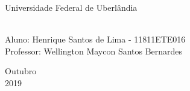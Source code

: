 \documentclass[a4paper, 12pt]{article}
\begin{document}

\begin{titlepage}
	\begin{center}
		\Huge{Universidade Federal de Uberlândia}\\
	   \textbf{\LARGE{}}\\
		\vspace{3,5cm}
	\end{center}
	
	\begin{flushleft}
		\begin{tabbing}
			Aluno: Henrique Santos de Lima - 11811ETE016\\
			Professor: Wellington Maycon Santos Bernardes\\
	\end{tabbing}
 \end{flushleft}
	\vspace{1cm}
	
	\begin{center}
		\vspace{\fill}
			 Outubro\\
		 2019
			\end{center}
\end{titlepage}

\end{document}
